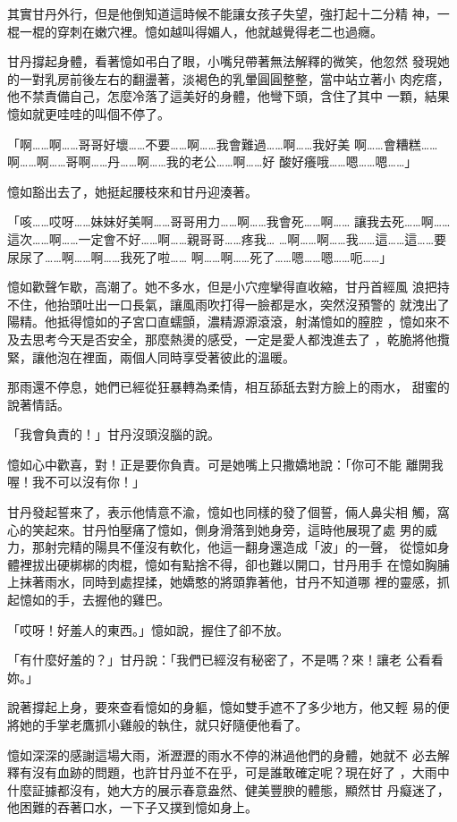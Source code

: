其實甘丹外行，但是他倒知道這時候不能讓女孩子失望，強打起十二分精
神，一棍一棍的穿刺在嫩穴裡。憶如越叫得媚人，他就越覺得老二也過癮。

甘丹撐起身體，看著憶如弔白了眼，小嘴兒帶著無法解釋的微笑，他忽然
發現她的一對乳房前後左右的翻盪著，淡褐色的乳暈圓圓整整，當中站立著小
肉疙瘩，他不禁責備自己，怎麼冷落了這美好的身體，他彎下頭，含住了其中
一顆，結果憶如就更哇哇的叫個不停了。

「啊……啊……哥哥好壞……不要……啊……我會難過……啊……我好美
啊……會糟糕……啊……啊……哥啊……丹……啊……我的老公……啊……好
酸好癢哦……嗯……嗯……」

憶如豁出去了，她挺起腰枝來和甘丹迎湊著。

「咳……哎呀……妹妹好美啊……哥哥用力……啊……我會死……啊……
讓我去死……啊……這次……啊……一定會不好……啊……親哥哥……疼我…
…啊……啊……我……這……這……要尿尿了……啊……啊……我死了啦……
啊……啊……死了……嗯……嗯……呃……」

憶如歡聲乍歇，高潮了。她不多水，但是小穴痙攣得直收縮，甘丹首經風
浪把持不住，他抬頭吐出一口長氣，讓風雨吹打得一臉都是水，突然沒預警的
就洩出了陽精。他抵得憶如的子宮口直蠕顫，濃精源源滾滾，射滿憶如的膣腔
，憶如來不及去思考今天是否安全，那麼熱燙的感受，一定是愛人都洩進去了
，乾脆將他攬緊，讓他泡在裡面，兩個人同時享受著彼此的溫暖。

那雨還不停息，她們已經從狂暴轉為柔情，相互舔舐去對方臉上的雨水，
甜蜜的說著情話。

「我會負責的！」甘丹沒頭沒腦的說。

憶如心中歡喜，對！正是要你負責。可是她嘴上只撒嬌地說：「你可不能
離開我喔！我不可以沒有你！」

甘丹發起誓來了，表示他情意不渝，憶如也同樣的發了個誓，倆人鼻尖相
觸，窩心的笑起來。甘丹怕壓痛了憶如，側身滑落到她身旁，這時他展現了處
男的威力，那射完精的陽具不僅沒有軟化，他這一翻身還造成「波」的一聲，
從憶如身體裡拔出硬梆梆的肉棍，憶如有點捨不得，卻也難以開口，甘丹用手
在憶如胸脯上抹著雨水，同時到處捏揉，她嬌憨的將頭靠著他，甘丹不知道哪
裡的靈感，抓起憶如的手，去握他的雞巴。

「哎呀！好羞人的東西。」憶如說，握住了卻不放。

「有什麼好羞的？」甘丹說：「我們已經沒有秘密了，不是嗎？來！讓老
公看看妳。」

說著撐起上身，要來查看憶如的身軀，憶如雙手遮不了多少地方，他又輕
易的便將她的手掌老鷹抓小雞般的執住，就只好隨便他看了。

憶如深深的感謝這場大雨，淅瀝瀝的雨水不停的淋過他們的身體，她就不
必去解釋有沒有血跡的問題，也許甘丹並不在乎，可是誰敢確定呢？現在好了
，大雨中什麼証據都沒有，她大方的展示春意盎然、健美豐腴的體態，顯然甘
丹癡迷了，他困難的吞著口水，一下子又撲到憶如身上。

